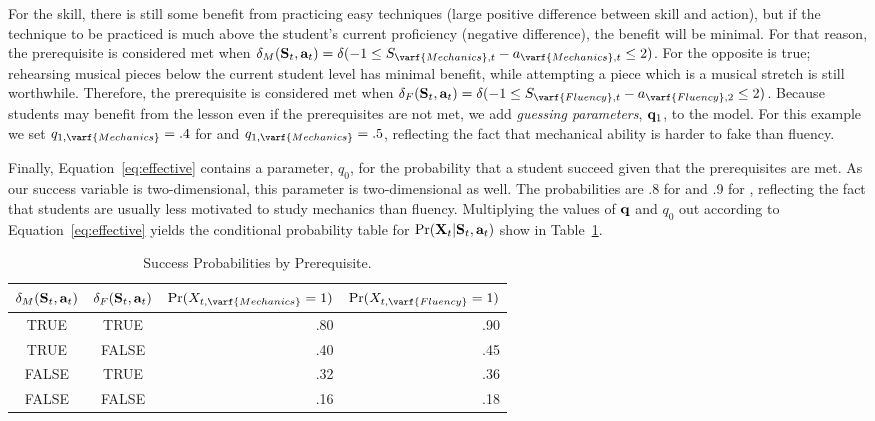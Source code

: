 \documentclass[12pt]{RR-article}
\begin{document}
For the  skill, there is still some benefit from
practicing easy techniques (large positive difference between skill
and action), but if the technique to be
practiced is much above the student's current 
proficiency (negative difference), the benefit will be minimal.  For
that reason, the  prerequisite is considered met when
$\delta_M ({\bf S}_t,{\bf a}_t) = \delta(-1 \leq
S_{\varf{Mechanics},t}-a_{\varf{Mechanics},t} \leq 2)$.  For
 the opposite is true; rehearsing musical pieces below
the current student level has minimal benefit, while attempting a
piece which is a musical stretch is still worthwhile.  Therefore, the
 prerequisite is considered met when $\delta_F
({\bf S}_t,{\bf a}_t) = \delta(-1 \leq
S_{\varf{Fluency},t}-a_{\varf{Fluency},2} \leq 2)$.  Because
students may benefit from the lesson even if the prerequisites are
not met, we add \textit{guessing parameters}, ${\bf q}_1$, to the
model.  For this example we set $q_{1,\varf{Mechanics}}= .4$ for and
$q_{1,\varf{Mechanics}}= .5$, reflecting the fact that mechanical
ability is harder to fake than fluency.

Finally, Equation~\ref{eq:effective} contains a parameter, $q_0$, for
the probability that a student succeed given that the prerequisites
are met.  As our success variable is two-dimensional, this parameter
is two-dimensional as well.  The probabilities are .8 for
 and .9 for , reflecting the fact that
students are usually less motivated to study mechanics than fluency.
Multiplying the values of ${\bf q}$ and $q_0$ out according to
Equation~\ref{eq:effective} yields the conditional probability table
for $\Pr({\bf X}_t|{\bf S}_t,{\bf a}_t)$ show in
Table~\ref{tab:success}.

\begin{table}[ht]
\caption{Success Probabilities by Prerequisite.}
\label{tab:success}
\begin{tabular}{cc|rr}
$\delta_M ({\bf S}_t,{\bf a}_t)$ & $\delta_F ({\bf S}_t,{\bf a}_t)$ &
$\Pr(X_{t,\varf{Mechanics}} = 1)$ & $\Pr(X_{t,\varf{Fluency}} = 1)$ \\
\hline
TRUE & TRUE & .80 & .90 \\
TRUE & FALSE & .40 & .45 \\
FALSE & TRUE & .32 & .36 \\
FALSE & FALSE & .16 & .18 \\
\end{tabular}
\end{table}
\end{document}
